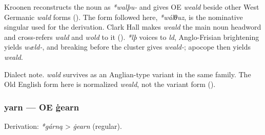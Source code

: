 \documentclass[
  british,
  a4paper,
]{article}
\begin{document}
Kroonen reconstructs the noun as \emph{*walþu-} and gives OE
\emph{weald} beside other West Germanic \emph{wald} forms
(). The form followed here,
\emph{*wálθuz}, is the nominative singular used for the derivation.
Clark Hall makes \emph{weald} the main noun headword and cross-refers
\emph{wald} and \emph{wold} to it (). \emph{*lþ} voices to \emph{ld}, Anglo-Frisian
brightening yields \emph{wæld-}, and breaking before the cluster gives
\emph{weald-}; apocope then yields \emph{weald}.

Dialect note. \emph{wald} survives as an Anglian-type variant in the
same family. The Old English form here is normalized \emph{weald}, not
the variant form ().

\subsubsection{yarn --- OE ġearn}\label{yarn-oe-ux121earn}

Derivation: \emph{*gárną} \textgreater{} \emph{ġearn} (regular).

\begingroup
\setlength{\fboxsep}{6pt}
\end{document}
